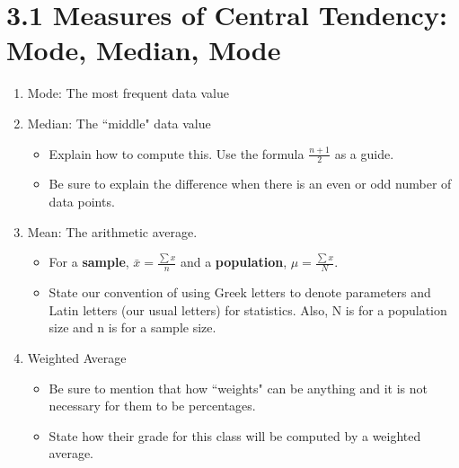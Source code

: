 \documentclass{article}
\begin{document}
\section*{3.1  Measures of Central Tendency: Mode, Median, Mode}

\begin{enumerate}

    \item Mode: The most frequent data value
    
    \item Median: The ``middle" data value
        
        \begin{itemize} 
        
            \item Explain how to compute this. Use the formula $\frac{n+1}{2}$ as a guide.
            
            \item Be sure to explain the difference when there is an even or odd number of data points.
            
        \end{itemize}
        
    \item Mean: The arithmetic average.
    
        \begin{itemize}
            
            \item For a {\bf sample}, $\bar{x} = \frac{\sum x}{n}$ and a {\bf population}, $\mu = \frac{\sum x}{N}.$
            
            \item State our convention of using Greek letters to denote parameters and Latin letters (our usual letters) for statistics. Also, N is for a population size and n is for a sample size.
            
        \end{itemize}
    
    \item Weighted Average
    
        \begin{itemize}
        
            \item Be sure to mention that how ``weights" can be anything and it is not necessary for them to be percentages.
            
            \item State how their grade for this class will be computed by a weighted average.
            

\end{itemize}
\end{enumerate}
\end{document}
